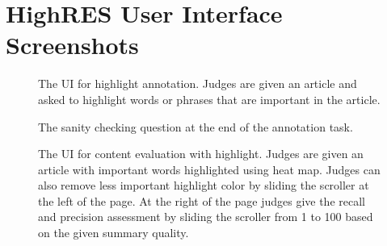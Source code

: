 \documentclass[11pt,a4paper]{article}
\begin{document}
\section{HighRES User Interface Screenshots}
\begin{figure}[h]
    \centering
    \caption{The UI for highlight annotation. Judges are given an article and asked to highlight words or phrases that are important in the article.}
\end{figure}
\begin{figure}[h]
    \centering
    \caption{The sanity checking question at the end of the annotation task.}
\end{figure}
\begin{figure}[h]
    \centering
    \caption{The UI for content evaluation with highlight. Judges are given an article with important words highlighted using heat map. Judges can also remove less important highlight color by sliding the scroller at the left of the page. At the right of the page judges give the recall and precision assessment by sliding the scroller from 1 to 100 based on the given summary quality.}
\end{figure}
\end{document}
